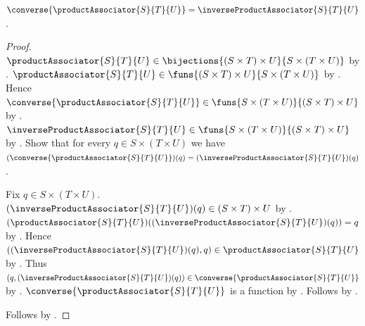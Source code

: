 \begin{theorem}\label{product_associator_converse}
    $\converse{\productAssociator{S}{T}{U}}
        =\inverseProductAssociator{S}{T}{U}$.
\end{theorem}
\begin{proof}
    $\productAssociator{S}{T}{U}\in
        \bijections{(S\times T)\times U}{S\times(T\times U)}$ by
        .
    $\productAssociator{S}{T}{U}\in
        \funs{(S\times T)\times U}{S\times(T\times U)}$ by
        .
    Hence $\converse{\productAssociator{S}{T}{U}}\in
        \funs{S\times(T\times U)}{(S\times T)\times U}$ by
        .
    $\inverseProductAssociator{S}{T}{U}\in
        \funs{S\times(T\times U)}{(S\times T)\times U}$ by
        .
    Show that for every $q\in S\times(T\times U)$ we have
        $(\converse{\productAssociator{S}{T}{U}})(q)
        =(\inverseProductAssociator{S}{T}{U})(q)$.
    \begin{subproof}
        Fix $q\in S\times(T\times U)$.
        $(\inverseProductAssociator{S}{T}{U})(q)
            \in(S\times T)\times U$ by .
        $(\productAssociator{S}{T}{U})
            ((\inverseProductAssociator{S}{T}{U})(q))=q$ by
            .
        Hence $((\inverseProductAssociator{S}{T}{U})(q),q)
            \in\productAssociator{S}{T}{U}$ by
            .
        Thus $(q,(\inverseProductAssociator{S}{T}{U})(q))
            \in\converse{\productAssociator{S}{T}{U}}$ by
            .
        $\converse{\productAssociator{S}{T}{U}}$ is a function by
            .
        Follows by .
    \end{subproof}
    Follows by .
\end{proof}
